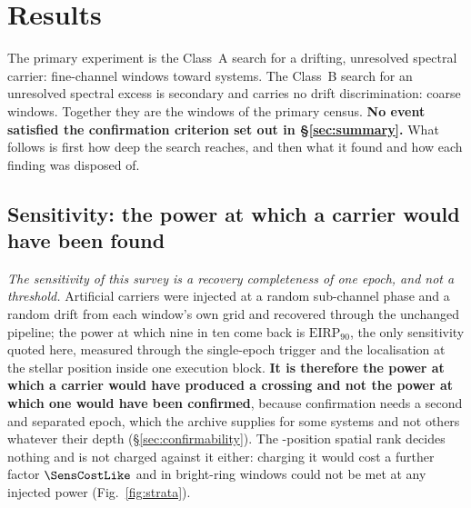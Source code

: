 \section{Results}
\label{sec:results}

The primary experiment is the Class~A search for a drifting, unresolved
spectral carrier: \NWinA{} fine-channel windows toward \NSysClassA{}
systems. The Class~B search for an unresolved spectral excess is secondary
and carries no drift discrimination: \NWinB{} coarse windows. Together they
are the \NWindows{} windows of the primary census. \textbf{No event
satisfied the confirmation criterion set out in \S\ref{sec:summary}.} What
follows is first how deep the search reaches, and then what it found and how
each finding was disposed of.

\subsection{Sensitivity: the power at which a carrier would have been
found} \label{sec:pninetysel}

\emph{The sensitivity of this survey is a recovery completeness of one epoch,
and not a threshold.} Artificial carriers were injected at a random
sub-channel phase and a random drift from each window's own grid and recovered
through the unchanged pipeline; the power at which nine in ten come back is
$\mathrm{EIRP}_{90}$, the only sensitivity quoted here, measured through the
single-epoch trigger and the localisation at the stellar position inside one
execution block. \textbf{It is therefore the power at which a
carrier would have produced a crossing and not the power at which one would
have been confirmed}, because confirmation needs a second and separated epoch,
which the archive supplies for some systems and not others whatever their
depth (\S\ref{sec:confirmability}). The \NCtrl-position spatial rank decides
nothing and is not charged against it either: charging it would cost a further
factor $\SensCostLike$ and in \SensNRingHiUnres{} bright-ring windows could not
be met at any injected power (Fig.~\ref{fig:strata}).

